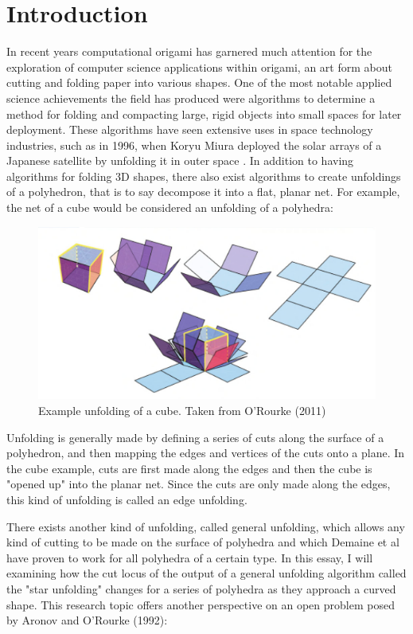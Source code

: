 \documentclass[12 pt]{article}
\begin{document}
\section{Introduction}
In recent years computational origami has garnered much attention for the exploration of computer science applications within origami, an art form about cutting and folding paper into various shapes. One of the most notable applied science achievements the field has produced were algorithms to determine a method for folding and compacting large, rigid objects into small spaces for later deployment. These algorithms have seen extensive uses in space technology industries, such as in 1996, when Koryu Miura deployed the solar arrays of a Japanese satellite by unfolding it in outer space \cite{FOLDIT:1}.
In addition to having algorithms for folding 3D shapes, there also exist algorithms to create unfoldings of a polyhedron, that is to say decompose it into a flat, planar net. For example, the net of a cube would be considered an unfolding of a polyhedra:
\begin{figure}[h]
\caption{Example unfolding of a cube. Taken from O'Rourke (2011)}
\centering
\includegraphics[scale=0.5]{latinCross.png}
\end{figure}

Unfolding is generally made by defining a series of cuts along the surface of a polyhedron, and then mapping the edges and vertices of the cuts onto a plane. In the cube example, cuts are first made along the edges and then the cube is "opened up" into the planar net. Since the cuts are only made along the edges, this kind of unfolding is called an edge unfolding.

There exists another kind of unfolding, called general unfolding, which allows any kind of cutting to be made on the surface of polyhedra and which Demaine et al have proven to work for all polyhedra of a certain type.\cite{GFALOP:1} In this essay, I will examining how the cut locus of the output of a general unfolding algorithm called the "star unfolding" changes for a series of polyhedra as they approach a curved shape. This research topic offers another perspective on an open problem posed by Aronov and O'Rourke (1992):
\end{document}
